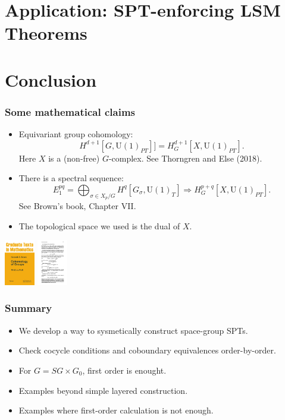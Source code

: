 \documentclass[xcolor=table, 10pt, aspectratio=43]{beamer}
\newcommand{\uone}{\mathrm U(1)}
\begin{document}
\section{Application: SPT-enforcing LSM Theorems}

\section{Conclusion}

\begin{frame}
\frametitle{Some mathematical claims}
\begin{itemize}
\item Equivariant group cohomology:
\[H^{d+1}[G, \uone_{PT}]]=H^{d+1}_G[X, \uone_{PT}].\]
Here $X$ is a (non-free) $G$-complex. See Thorngren and Else (2018).
\item There is a spectral sequence:
\[E_1^{pq}=\bigoplus_{\sigma\in X_p/G}H^q[G_\sigma,\uone_T]\Rightarrow
H^{p+q}_G[X,\uone_{PT}].\]
See Brown's book, Chapter VII.
\item The topological space we used is the dual of $X$.
\end{itemize}
\begin{center}
	\includegraphics[height=2cm]{brown_book}
	\includegraphics[height=2cm]{brown_ss}
\end{center}
\end{frame}

\begin{frame}
\frametitle{Summary}
\begin{itemize}
\item We develop a way to sysmetically construct space-group SPTs.
\item Check cocycle conditions and coboundary equivalences order-by-order.
\item For $G=SG\times G_0$, first order is enought.
\item Examples beyond simple layered construction.
\item Examples where first-order calculation is not enough.
\end{itemize}
\end{frame}
\end{document}
